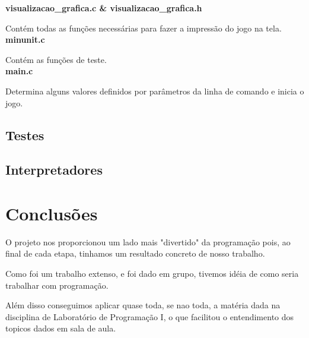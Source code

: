 \documentclass[12pt,a4paper]{article}
\begin{document}
\textbf{visualizacao\_grafica.c \& visualizacao\_grafica.h}

Contém todas as funções necessárias para fazer a impressão do jogo na tela.\\

\textbf{minunit.c}

Contém as funções de teste.\\

\textbf{main.c}

Determina alguns valores definidos por parâmetros da linha de comando e inicia o jogo.\\


\subsection{Testes}
\subsection{Interpretadores}

\section{Conclusões}

O projeto nos proporcionou um lado mais "divertido"  da programação pois, ao final de cada etapa, tinhamos um resultado
concreto de nosso trabalho.

Como foi um trabalho extenso, e foi dado em grupo, tivemos idéia de como seria trabalhar com programação.

Além disso conseguimos aplicar quase toda, se nao toda, a matéria dada na disciplina de Laboratório de Programação I,
o que facilitou o entendimento dos topicos dados em sala de aula.
\end{document}
